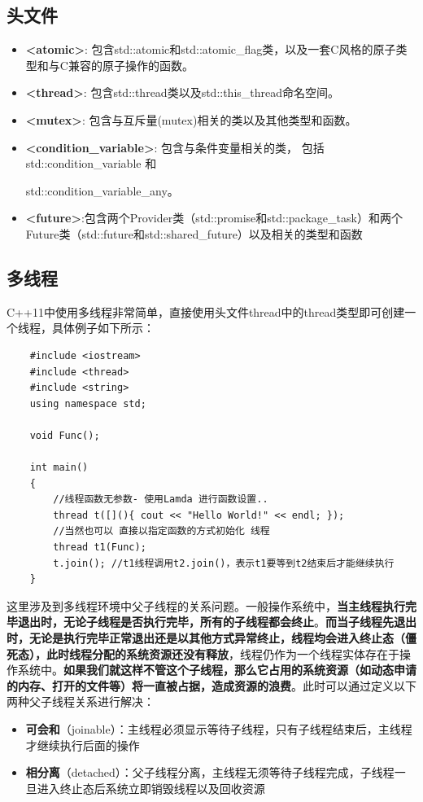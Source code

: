 \documentclass[UTF8,a4paper,12pt]{ctexbook}
\begin{document}
	\subsection{头文件}
		\begin{itemize}
			\item \textbf{<atomic>}: 包含std::atomic和std::atomic\_flag类，以及一套C风格的原子类型和与C兼容的原子操作的函数。
			\item \textbf{<thread>}: 包含std::thread类以及std::this\_thread命名空间。
			\item \textbf{<mutex>}: 包含与互斥量(mutex)相关的类以及其他类型和函数。
			\item \textbf{<condition\_variable>}: 包含与条件变量相关的类， 包括std::condition\_variable 和
			
			 std::condition\_variable\_any。
			\item \textbf{<future>}:包含两个Provider类（std::promise和std::package\_task）和两个Future类（std::future和std::shared\_future）以及相关的类型和函数
		\end{itemize}
		
	\subsection{多线程}
		C++11中使用多线程非常简单，直接使用头文件thread中的thread类型即可创建一个线程，具体例子如下所示：
		\begin{lstlisting}
	#include <iostream>
	#include <thread>
	#include <string>
	using namespace std;
	
	void Func();
	
	int main()
	{
		//线程函数无参数- 使用Lamda 进行函数设置..
		thread t([](){ cout << "Hello World!" << endl; });
		//当然也可以 直接以指定函数的方式初始化 线程
		thread t1(Func);
		t.join(); //t1线程调用t2.join()，表示t1要等到t2结束后才能继续执行
	}
		\end{lstlisting}
		
		这里涉及到多线程环境中父子线程的关系问题。一般操作系统中，\textbf{当主线程执行完毕退出时，无论子线程是否执行完毕，所有的子线程都会终止}。\textbf{而当子线程先退出时，无论是执行完毕正常退出还是以其他方式异常终止，线程均会进入终止态（僵死态），此时线程分配的系统资源还没有释放}，线程仍作为一个线程实体存在于操作系统中。\textbf{如果我们就这样不管这个子线程，那么它占用的系统资源（如动态申请的内存、打开的文件等）将一直被占据，造成资源的浪费}。此时可以通过定义以下两种父子线程关系进行解决：
		
		\begin{itemize}
			\item \textbf{可会和}（joinable）：主线程必须显示等待子线程，只有子线程结束后，主线程才继续执行后面的操作
			\item \textbf{相分离}（detached）：父子线程分离，主线程无须等待子线程完成，子线程一旦进入终止态后系统立即销毁线程以及回收资源
		\end{itemize}
		
\end{document}
